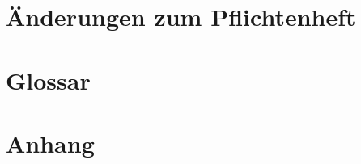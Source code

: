 \documentclass[a4paper]{scrreprt}
\begin{document}
\chapter{Änderungen zum Pflichtenheft}

\chapter{Glossar}

\chapter{Anhang}
\end{document}
